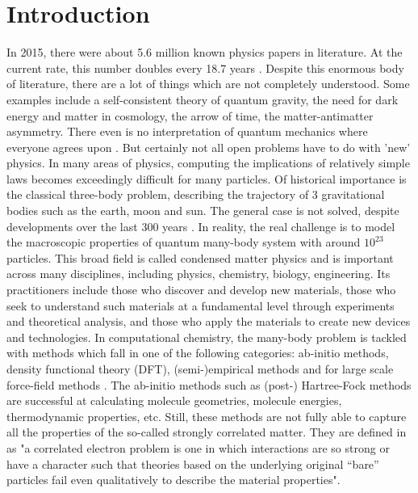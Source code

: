 
\section{Introduction}

In 2015, there were about 5.6 million known physics papers in literature. At the current rate, this number doubles every 18.7 years \cite{Sinatra2015}. Despite this enormous body of literature, there are a lot of things which are not completely understood. Some examples include a self-consistent theory of quantum gravity, the need for dark energy and matter in cosmology, the arrow of time, the matter-antimatter asymmetry. There even is no interpretation of quantum mechanics where everyone agrees upon \cite{Lulea2015}.
But certainly not all open problems have to do with 'new' physics. In many areas of physics, computing the implications of relatively simple laws becomes exceedingly difficult for many particles. Of historical importance is the classical three-body problem, describing the trajectory of 3 gravitational bodies such as the earth, moon and sun. The general case is not solved, despite developments over the last 300 years \cite{Musielak2014}.
In reality, the real challenge is to model the macroscopic properties of quantum many-body system with around $10^{23}$ particles. This broad field is called condensed matter physics and is important across many disciplines, including physics, chemistry, biology, engineering. Its practitioners include those who discover and develop new materials, those who seek to understand such materials at a fundamental level through experiments and theoretical analysis, and those who apply the materials to create new devices and technologies.  \cite{Mora-Aznar2000}
In computational chemistry, the many-body problem is tackled with methods which fall in one of the following categories: ab-initio methods, density functional theory (DFT), (semi-)empirical methods and for large scale force-field methods \cite{Lewars2011}. The ab-initio methods such as (post-) Hartree-Fock methods are successful at calculating molecule geometries, molecule energies, thermodynamic properties, etc. \cite{Lewars2011}
Still, these methods are not fully able to capture all the properties of the so-called strongly correlated matter. They are defined in \cite{Alexandradinata2020} as "a correlated electron problem is one in which interactions are so strong or have a character such that theories based on the underlying original “bare” particles fail even qualitatively to describe the material properties".
